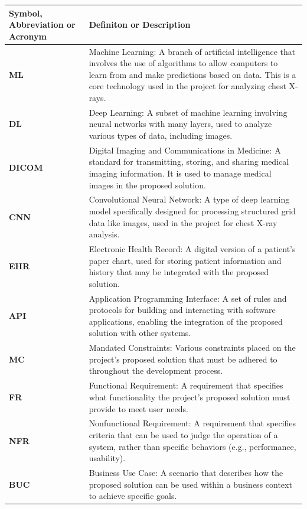 \documentclass[12pt, titlepage]{article}
\begin{document}
\begin{longtable}[c]{|p{}|p{}|}
  \hline
  \textbf{Symbol, Abbreviation or Acronym} & \textbf{Definiton or Description} \\ \hline
  \textbf{ML} & Machine Learning: A branch of artificial intelligence that involves the use of algorithms to allow computers to learn from and make predictions based on data. This is a core technology used in the project for analyzing chest X-rays. \\ \hline
  \textbf{DL} & Deep Learning: A subset of machine learning involving neural networks with many layers, used to analyze various types of data, including images. \\ \hline
  \textbf{DICOM} & Digital Imaging and Communications in Medicine: A standard for transmitting, storing, and sharing medical imaging information. It is used to manage medical images in the proposed solution. \\ \hline
  \textbf{CNN} & Convolutional Neural Network: A type of deep learning model specifically designed for processing structured grid data like images, used in the project for chest X-ray analysis. \\ \hline
  \textbf{EHR} & Electronic Health Record: A digital version of a patient's paper chart, used for storing patient information and history that may be integrated with the proposed solution. \\ \hline
  \textbf{API} & Application Programming Interface: A set of rules and protocols for building and interacting with software applications, enabling the integration of the proposed solution with other systems. \\ \hline
  \textbf{MC} & Mandated Constraints: Various constraints placed on the project's proposed solution that must be adhered to throughout the development process. \\ \hline
  \textbf{FR} & Functional Requirement: A requirement that specifies what functionality the project's proposed solution must provide to meet user needs. \\ \hline
  \textbf{NFR} & Nonfunctional Requirement: A requirement that specifies criteria that can be used to judge the operation of a system, rather than specific behaviors (e.g., performance, usability). \\ \hline
  \textbf{BUC} & Business Use Case: A scenario that describes how the proposed solution can be used within a business context to achieve specific goals. \\ \hline

\end{longtable}
\end{document}
